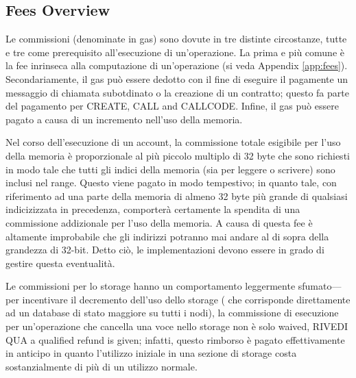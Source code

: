 \documentclass[9pt,oneside]{amsart}
\begin{document}
\begin{multicols}{2}
\subsection{Fees Overview}

Le commissioni (denominate in gas) sono dovute in tre distinte circostanze, tutte e tre come prerequisito all'esecuzione di un'operazione. La prima e più comune è la fee inrinseca alla computazione di un'operazione (si veda Appendix \ref{app:fees}). Secondariamente,  il gas può essere dedotto con il fine di eseguire il pagamente un messaggio di chiamata subotdinato o la creazione di un contratto; questo fa parte del pagamento per {\small CREATE}, {\small CALL} and {\small CALLCODE}. Infine, il gas può essere pagato a causa di un incremento nell'uso della memoria.

Nel corso dell'esecuzione di un account, la commissione totale esigibile per l'uso della memoria è proporzionale al più piccolo multiplo di 32 byte che sono richiesti in modo tale che tutti gli indici della memoria (sia per leggere o scrivere) sono inclusi nel range. Questo viene pagato in modo tempestivo; in quanto tale, con riferimento ad una parte della memoria di almeno 32 byte più grande di qualsiasi indicizizzata in precedenza, comporterà certamente la spendita di una commissione addizionale per l'uso della memoria. A causa di questa fee è altamente improbabile che gli indirizzi potranno mai andare al di sopra della grandezza di 32-bit. Detto ciò, le implementazioni devono essere in grado di gestire questa eventualità.

Le commissioni per lo storage hanno un comportamento leggermente sfumato---per incentivare il decremento dell'uso dello storage (
che corrisponde direttamente ad un database di stato maggiore su tutti i nodi), la commissione di esecuzione per un'operazione che cancella una voce nello storage non è solo waived, RIVEDI QUA a qualified refund is given; infatti, questo rimborso è pagato effettivamente in anticipo in quanto l'utilizzo iniziale in una sezione di storage costa sostanzialmente di più di un utilizzo normale.


\end{multicols}
\end{document}
